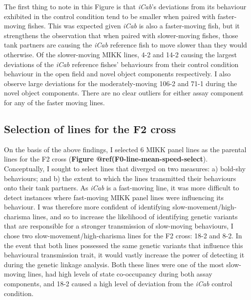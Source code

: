 \documentclass[
]{article}
\begin{document}
The first thing to note in this Figure is that \emph{\textcolor{iCab_424B4D}{iCab}}'s deviations from its behaviour exhibited in the control condition tend to be smaller when paired with faster-moving fishes. This was expected given \emph{\textcolor{iCab_424B4D}{iCab}} is also a faster-moving fish, but it strengthens the observation that when paired with slower-moving fishes, those tank partners are causing the \emph{\textcolor{iCab_424B4D}{iCab}} reference fish to move slower than they would otherwise. Of the slower-moving MIKK lines, \textcolor{4-2_FC61D4}{4-2} and \textcolor{14-2_F066EA}{14-2} causing the largest deviations of the \emph{\textcolor{iCab_424B4D}{iCab}} reference fishes' behaviours from their control condition behaviour in the open field and novel object components respectively. I also observe large deviations for the moderately-moving \textcolor{106-2_00B9E3}{106-2} and \textcolor{71-1_00BECD}{71-1} during the novel object components. There are no clear outliers for either assay component for any of the faster moving lines.

\hypertarget{selection-of-lines-for-the-f2-cross}{%
\subsection{Selection of lines for the F2 cross}\label{selection-of-lines-for-the-f2-cross}}

On the basis of the above findings, I selected 6 MIKK panel lines as the parental lines for the F2 cross (\textbf{Figure @ref(F0-line-mean-speed-select}). Conceptually, I sought to select lines that diverged on two measures: a) bold-shy behaviours; and b) the extent to which the lines transmitted their behaviours onto their tank partners. As \emph{\textcolor{iCab_424B4D}{iCab}} is a fast-moving line, it was more difficult to detect instances where fast-moving MIKK panel lines were influencing its behaviour. I was therefore more confident of identifying slow-movement/high-charisma lines, and so to increase the likelihood of identifying genetic variants that are responsible for a stronger transmission of slow-moving behaviours, I chose two slow-movement/high-charisma lines for the F2 cross: \textcolor{18-2_FF66A6}{18-2} and \textcolor{8-2_FF699C}{8-2}. In the event that both lines possessed the same genetic variants that influence this behavioural transmission trait, it would vastly increase the power of detecting it during the genetic linkage analysis. Both these lines were one of the most slow-moving lines, had high levels of state co-occupancy during both assay components, and \textcolor{18-2_FF66A6}{18-2} caused a high level of deviation from the \emph{\textcolor{iCab_424B4D}{iCab}} control condition.
\end{document}
